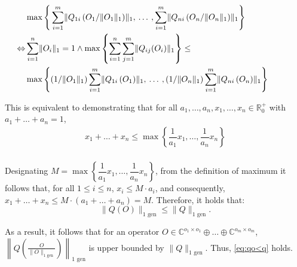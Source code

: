 \begin{align*}
  \hspace{-30pt}& \max \Bigg\{  \sum_{i=1}^{m}  \lVert Q_{1i}  \left(O_{1} / \lVert O_{1} \rVert_1\right) \rVert_{1} , \hspace{2pt} \ldots \hspace{2pt}, \sum_{i=1}^{m} \lVert Q_{ni}  \left(O_{n} / \lVert O_{n} \rVert_1\right) \rVert_{1} \Bigg\}  \\
  \hspace{-30pt} \Leftrightarrow  &  \sum_{i=1}^{n} \lVert O_i  \rVert_1 = 1   \wedge \max \left\{ \sum_{i=1}^{n} \sum_{j=1}^{m} \lVert Q_{ij} (O_{i}) \rVert_{1} \right\} \leq   \\
  \hspace{-30pt}& \max \Bigg\{ (1 / \lVert O_{1} \rVert_1) \sum_{i=1}^{m}  \lVert Q_{1i}  \left(O_{1} \right) \rVert_{1}, \hspace{2pt} \ldots \hspace{2pt}, (1 / \lVert O_{n} \rVert_1) \sum_{i=1}^{m} \lVert Q_{ni}  \left(O_{n}\right) \rVert_{1} \Bigg\}    
  \end{align*}

  This is equivalent to demonstrating that for all $a_1, \ldots, a_n, x_1, \ldots, x_n \in \mathbb{R}^{+}_{0}$ with $a_1+ \ldots + a_n=1$,
  \begin{equation} 
  \begin{split}
      x_1 + \ldots + x_n  \leq  \max \left\{   \dfrac{1}{a_1} x_1  , \ldots , \dfrac{1}{a_n} x_n   \right\} \\
  \end{split}
  \end{equation}

  Designating $M = \max \left\{   \dfrac{1}{a_1} x_1  , \ldots , \dfrac{1}{a_n} x_n   \right\}$, from the definition of maximum it follows that, for all $1 \leq i \leq n$, $x_i \leq M \cdot a_i$, and consequently, $x_1 + \ldots + x_n \leq M \cdot (a_1 + \ldots + a_n) = M$. Therefore, it holds that:
  \begin{equation}
    \lVert Q(O) \rVert_{1 \text{ gen}} \leq  \lVert Q \rVert_{1 \text{ gen}}.
  \end{equation} 

  As a result, it follows that for an operator $O \in \mathbb{C}^{o_1 \times o_1} \oplus \ldots \oplus  \mathbb{C}^{o_m \times o_m}$,  $ \left\lVert Q\left(\frac{O}{\lVert O \rVert_{1 \text{ gen}}}\right)  \right\rVert_{1 \text{ gen}}$ is upper bounded by $\lVert Q  \rVert_{1 \text{ gen}}$. Thus, \autoref{eq:qo<q} holds.